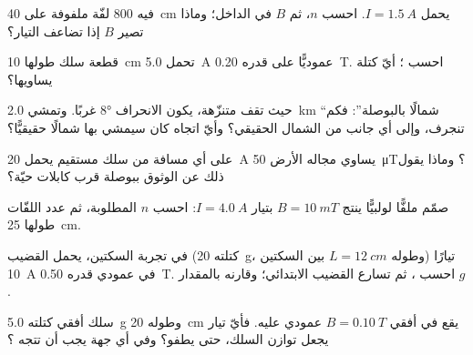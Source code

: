 \begin{exercise}[$\star$]\label{exo:g11:magnetic-fields:4}
 فيه $800$ لفّة ملفوفة على \qty{40}{cm} يحمل
$I = \qty{1.5}{A}$. احسب $n$، ثم $B$ في الداخل؛ وماذا تصير $B$
إذا تضاعف التيار؟
\end{exercise}

\begin{exercise}[$\star$]\label{exo:g11:magnetic-fields:5}
قطعة سلك طولها \qty{10}{cm} تحمل \qty{5.0}{A}
عموديًّا على  قدره \qty{0.20}{T}. احسب ؛ 
أيّ كتلة يساويها؟
\end{exercise}

\begin{exercise}[$\star\star$]\label{exo:g11:magnetic-fields:6}
حيث تقف متنزّهة، يكون الانحراف $\ang{8}$ غربًا. وتمشي
\qty{2.0}{km} ``شمالًا بالبوصلة'': فكم تنجرف، وإلى أي جانب من الشمال
الحقيقي؟ وأيّ اتجاه كان سيمشي بها شمالًا حقيقيًّا؟
\end{exercise}

\begin{exercise}[$\star\star$]\label{exo:g11:magnetic-fields:7}
على أي مسافة من سلك مستقيم يحمل \qty{20}{A} يساوي
مجاله  الأرض \qty{50}{\micro T}؟ وماذا يقول ذلك عن
الوثوق ببوصلة قرب كابلات حيّة؟
\end{exercise}

\begin{exercise}[$\star\star$]\label{exo:g11:magnetic-fields:8}
صمّم ملفًّا لولبيًّا ينتج $B = \qty{10}{mT}$ بتيار $I = \qty{4.0}{A}$:
احسب $n$ المطلوبة، ثم عدد اللفّات  طولها \qty{25}{cm}.
\end{exercise}

\begin{exercise}[$\star\star$]\label{exo:g11:magnetic-fields:9}
في تجربة السكتين، يحمل القضيب (كتلته \qty{20}{g}، وطوله
$L = \qty{12}{cm}$ بين السكتين) تيارًا \qty{10}{A} في 
عمودي قدره \qty{0.50}{T}. احسب ، ثم
تسارع القضيب الابتدائي؛ وقارنه بالمقدار $g$.
\end{exercise}

\begin{exercise}[$\star\star$]\label{exo:g11:magnetic-fields:10}
سلك أفقي كتلته \qty{5.0}{g} وطوله \qty{20}{cm} يقع في
 أفقي $B = \qty{0.10}{T}$ عمودي عليه. فأيّ
تيار يجعل  توازن  السلك، حتى
يطفو؟ وفي أي جهة يجب أن تتجه ؟
\end{exercise}

